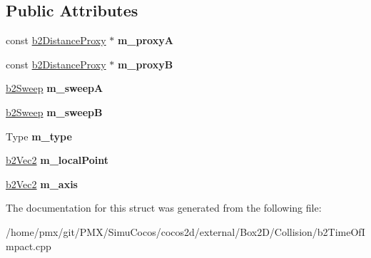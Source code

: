 \subsection*{Public Attributes}
\begin{DoxyCompactItemize}
\item 
\mbox{\label{structb2SeparationFunction_a5c03d798e97cd653aa7db390275bf9a7}} 
const \hyperlink{structb2DistanceProxy}{b2\+Distance\+Proxy} $\ast$ {\bfseries m\+\_\+proxyA}
\item 
\mbox{\label{structb2SeparationFunction_a25fc938e03bf77ac276b17b24e52958f}} 
const \hyperlink{structb2DistanceProxy}{b2\+Distance\+Proxy} $\ast$ {\bfseries m\+\_\+proxyB}
\item 
\mbox{\label{structb2SeparationFunction_a46b838a661baa40cde771b779c2ff341}} 
\hyperlink{structb2Sweep}{b2\+Sweep} {\bfseries m\+\_\+sweepA}
\item 
\mbox{\label{structb2SeparationFunction_a11ba433f6e524fb92390bd8b4dd376b6}} 
\hyperlink{structb2Sweep}{b2\+Sweep} {\bfseries m\+\_\+sweepB}
\item 
\mbox{\label{structb2SeparationFunction_a51075eff2de404a1d82eee831fdfd4af}} 
Type {\bfseries m\+\_\+type}
\item 
\mbox{\label{structb2SeparationFunction_ab77a17de0f5c708212090f599ec1795e}} 
\hyperlink{structb2Vec2}{b2\+Vec2} {\bfseries m\+\_\+local\+Point}
\item 
\mbox{\label{structb2SeparationFunction_a767b8fc4174d200ae8fb1d2bfba3407b}} 
\hyperlink{structb2Vec2}{b2\+Vec2} {\bfseries m\+\_\+axis}
\end{DoxyCompactItemize}


The documentation for this struct was generated from the following file\+:\begin{DoxyCompactItemize}
\item 
/home/pmx/git/\+P\+M\+X/\+Simu\+Cocos/cocos2d/external/\+Box2\+D/\+Collision/b2\+Time\+Of\+Impact.\+cpp\end{DoxyCompactItemize}
